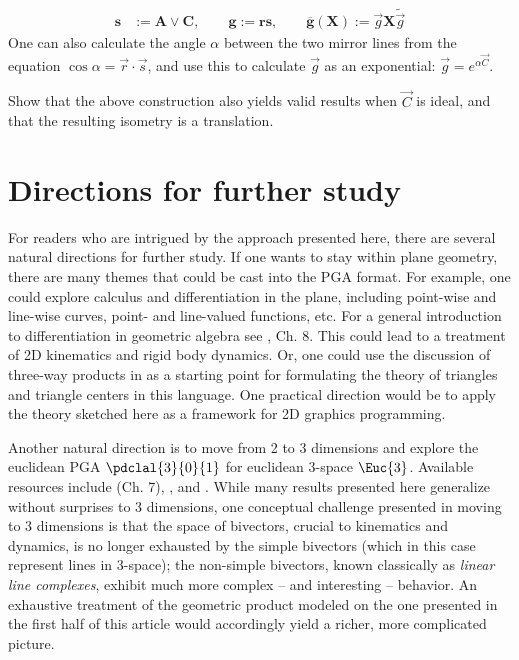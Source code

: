 \documentclass[12pt]{article}
\newcommand{\mydogblue}{{\color{gray} $\square$~~}}
\begin{document}
\begin{align*}
\mathbf{s} &:= \mathbf{A} \vee \mathbf{C}, \qquad %
\mathbf{g} := \mathbf{r}  \mathbf{s}, \qquad%
\overline{\mathbf{g}}(\mathbf{X})  := \vec{g} \mathbf{X} \widetilde{\vec{g}}  %
 \end{align*}
 One can also calculate the angle $\alpha$ between the two mirror lines from the equation $\cos{{\alpha}} = \vec{r} \cdot \vec{s}$, and use this to calculate $\vec{g}$ as an exponential: $\vec{g} = e^{\alpha \vec{C}}$. %

\myexercise  Show that the above construction also yields valid results when $\vec{C}$ is ideal, and that the resulting isometry is a translation. %
 
% 

\section{Directions for further study}
\label{sec:neg}

\def\MN{metric-neutral\xspace}

For readers who are intrigued by the approach presented here, there are several natural directions for further study.  If one wants to stay within plane geometry, there are many themes that could be cast into the PGA format. For example,  one could explore calculus and differentiation in the plane, including point-wise and line-wise curves, point- and line-valued functions, etc.  For a general introduction to differentiation in geometric algebra see \cite{dfm07}, Ch. 8.  This could lead to a treatment of 2D kinematics and rigid body dynamics.  Or, one could use the discussion of three-way products in  as a starting point for formulating the theory of triangles and triangle centers in this language.  One practical direction would be to apply the theory sketched here as a framework for 2D graphics programming.

Another natural direction  is to move from 2 to 3 dimensions and explore the euclidean PGA $\pdclal{3}{0}{1}$ for euclidean 3-space $\Euc{3}$. Available resources include \cite{gunnThesis} (Ch. 7), \cite{gunn2011}, and \cite{gunnFull2010}.  While many results presented here generalize without surprises to 3 dimensions, one conceptual challenge presented in moving to 3 dimensions is that the space of bivectors, crucial to kinematics and dynamics, is no longer exhausted by the simple bivectors (which in this case represent lines in 3-space); the non-simple bivectors, known classically as \emph{linear line complexes}, exhibit much more complex -- and interesting -- behavior. An exhaustive treatment of the geometric product modeled on the one presented in the first half of this article would accordingly yield a richer, more complicated picture.
\end{document}
